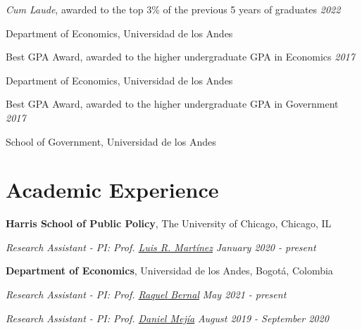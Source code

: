 \documentclass[margin,line]{res}
\newenvironment{list1}{
  \begin{list}{\ding{113}}{%
      \setlength{\itemsep}{0in}
      \setlength{\parsep}{0in} \setlength{\parskip}{0in}
      \setlength{\topsep}{0in} \setlength{\partopsep}{0in} 
      \setlength{\leftmargin}{0.17in}}}{\end{list}}
\begin{document}
\begin{resume}
\textit{Cum Laude}, awarded to the top 3\% of the previous 5 years of graduates \hfill  {\it 2022}
\begin{list1}
\item[]Department of Economics, Universidad de los Andes
\end{list1}

Best GPA Award, awarded to the higher undergraduate GPA in Economics  \hfill  {\it 2017}
\begin{list1}
\item[]Department of Economics, Universidad de los Andes
\end{list1}

Best GPA Award, awarded to the higher undergraduate GPA in Government \hfill  {\it 2017}
\begin{list1}
\item[]School of Government, Universidad de los Andes
\end{list1}

\vspace{.1cm}

\section{\sc Academic Experience}
{\bf Harris School of Public Policy}, The University of Chicago, Chicago, IL

\vspace{-.1cm}
{\em Research Assistant - PI: Prof. \href{https://sites.google.com/site/lrmartineza}{Luis R. Martínez}} \hfill \emph{January 2020 - present}

\vspace{.1cm}

{\bf Department of Economics}, Universidad de los Andes, Bogotá, Colombia

\vspace{-.1cm}
{\em Research Assistant - PI: Prof. \href{https://sites.google.com/view/raquelbernal/home}{Raquel Bernal}} \hfill \emph{May 2021 - present}


 

\vspace{-.1cm}
{\em Research Assistant - PI: Prof. \href{https://sites.google.com/view/danielmejial}{Daniel Mejía}} \hfill \emph{August 2019 - September 2020}


\end{resume}
\end{document}
